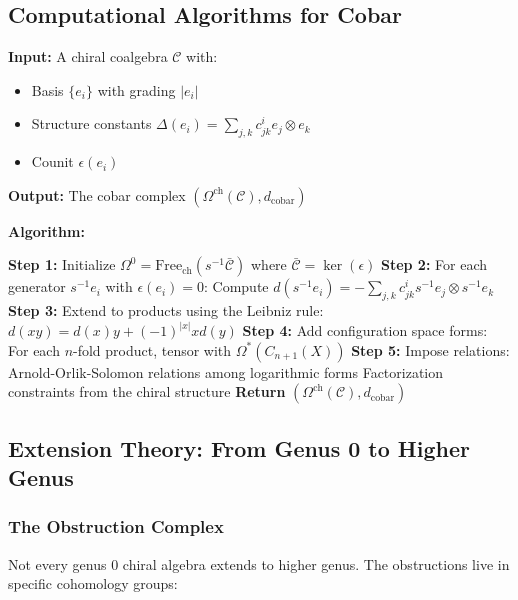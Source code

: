\subsection{Computational Algorithms for Cobar}

\begin{algorithm}
\textbf{Input:} A chiral coalgebra $\mathcal{C}$ with:
\begin{itemize}
\item Basis $\{e_i\}$ with grading $|e_i|$
\item Structure constants $\Delta(e_i) = \sum_{j,k} c_{jk}^i e_j \otimes e_k$
\item Counit $\epsilon(e_i)$
\end{itemize}

\textbf{Output:} The cobar complex $(\Omega^{\text{ch}}(\mathcal{C}), d_{\text{cobar}})$

\textbf{Algorithm:}
\begin{algorithmic}
\State \textbf{Step 1:} Initialize $\Omega^0 = \text{Free}_{\text{ch}}(s^{-1}\bar{\mathcal{C}})$ where $\bar{\mathcal{C}} = \ker(\epsilon)$
\State \textbf{Step 2:} For each generator $s^{-1}e_i$ with $\epsilon(e_i) = 0$:
\State \quad Compute $d(s^{-1}e_i) = -\sum_{j,k} c_{jk}^i s^{-1}e_j \otimes s^{-1}e_k$
\State \textbf{Step 3:} Extend to products using the Leibniz rule:
\State \quad $d(xy) = d(x)y + (-1)^{|x|}xd(y)$
\State \textbf{Step 4:} Add configuration space forms:
\State \quad For each $n$-fold product, tensor with $\Omega^*(C_{n+1}(X))$
\State \textbf{Step 5:} Impose relations:
\State \quad Arnold-Orlik-Solomon relations among logarithmic forms
\State \quad Factorization constraints from the chiral structure
\State \textbf{Return} $(\Omega^{\text{ch}}(\mathcal{C}), d_{\text{cobar}})$
\end{algorithmic}
\end{algorithm}

\subsection{Extension Theory: From Genus 0 to Higher Genus}

\subsubsection{The Obstruction Complex}

Not every genus 0 chiral algebra extends to higher genus. The obstructions live in specific cohomology groups:


